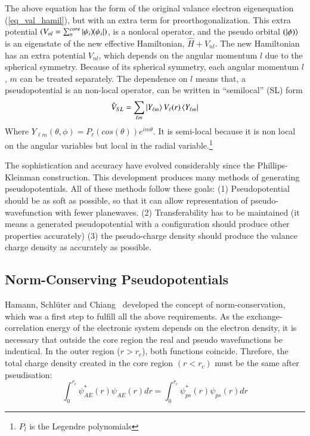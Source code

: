 The above equation has the form of the original valance electron eigenequation (\ref{eq_val_hamil}), but with an extra term for preorthogonalization. This extra potential $(V_{nl} = \sum_n^{core} \dyad{\psi_i}{\psi_i})$, is a nonlocal operator, and the pseudo orbital $(\ket{\phi)}$ is an eigenstate of the new effective Hamiltonian, $\hat{H} + V_{nl}$. The new Hamiltonian has an extra potential $V_{nl}$, which depends on the angular momentum $l$ due to the spherical symmetry. Because of its spherical symmetry, each angular momentum $l$, $m$ can be treated separately. The dependence on $l$ means that, a pseudopotential is an non-local operator, can be written in ``semilocal'' (SL) form
\begin{equation}
\label{eq_sl}
\hat{V}_{SL} = \sum_{\ell m} \ket{Y_{\ell m}}V_\ell(r)\bra{Y_{\ell m}}
\end{equation}
Where $Y_{\ell m}(\theta,\phi) = P_\ell(cos(\theta))e^{im\theta}$. It is semi-local because it is non local on the angular variables but local in the radial variable.\footnote{$P_l$ is the Legendre polynomials}


The sophistication and accuracy have evolved considerably since the Phillips-Kleinman construction. This development produces many methods of generating pseudopotentials. All of these methods follow these goals: (1) Pseudopotential should be as soft as possible, so that it can allow representation of pseudo-wavefunction with fewer planewaves. (2) Transferability has to be maintained (it means a generated pseudopotential with a configuration should produce other properties accurately) (3) the pseudo-charge density should produce the valance charge density as accurately as possible. 


\subsection{Norm-Conserving Pseudopotentials}
Hamann, Schl\"uter and Chiang~\cite{hamann1979norm} developed the concept of norm-conservation, which was a first step to fulfill all the above requirements. As the exchange-correlation energy of the electronic system depends on the electron density, it is necessary that outside the core region the real and pseudo wavefunctions be indentical. In the outer region ($r > r_c$), both functions coincide. Threfore, the total charge density created in the core region $(r < r_c)$ must be the same after pseudisation:
\begin{equation}
\int^{r_{c}}_0 \psi^{\ast}_{AE}(r)\psi_{AE}(r)dr = \int^{r_c}_0 \psi^{\ast}_{ps}(r)\psi_{ps}(r)dr
\end{equation}

